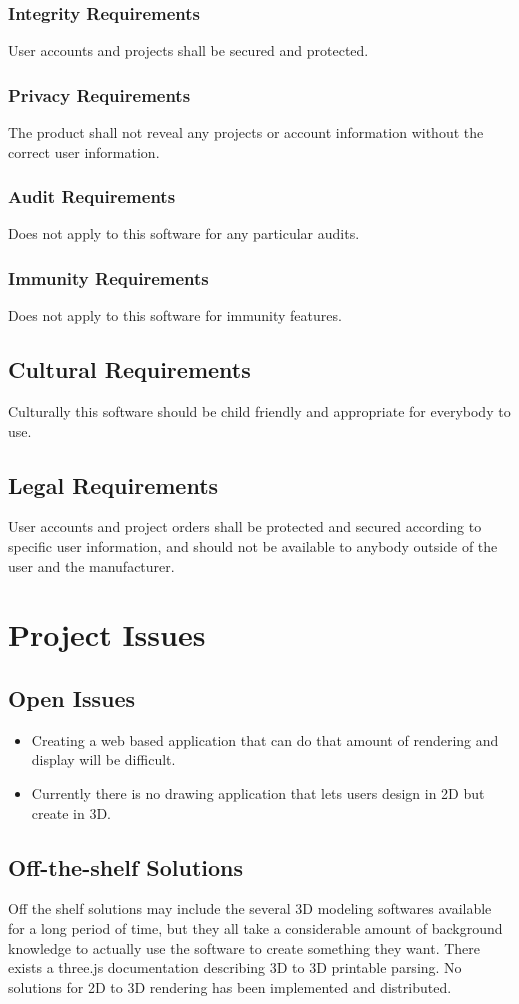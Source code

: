 \documentclass{report}
\begin{document}
\subsection{Integrity Requirements}
User accounts and projects shall be secured and protected.
\subsection{Privacy Requirements}
The product shall not reveal any projects or account information without the correct user information.
\subsection{Audit Requirements}
Does not apply to this software for any particular audits.
\subsection{Immunity Requirements}
Does not apply to this software for immunity features.
\section{Cultural Requirements}
Culturally this software should be child friendly and appropriate for everybody to use.
\section{Legal Requirements}
User accounts and project orders shall be protected and secured according to specific user information, and should not be available to anybody outside of the user and the manufacturer.

\chapter{Project Issues}
\section{Open Issues}
\begin{itemize}
\item Creating a web based application that can do that amount of rendering and display will be difficult.
\item Currently there is no drawing application that lets users design in 2D but create in 3D.
\end{itemize}
\section{Off-the-shelf Solutions}
Off the shelf solutions may include the several 3D modeling softwares available for a long period of time, but they all take a considerable amount of background knowledge to actually use the software to create something they want.  There exists a three.js documentation describing 3D to 3D printable parsing.  No solutions for 2D to 3D rendering has been implemented and distributed.
\end{document}
